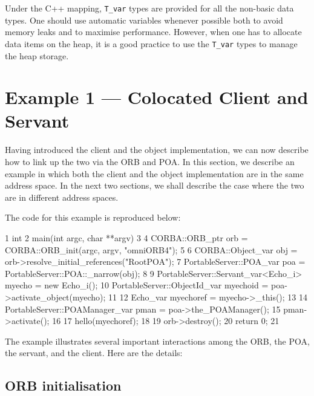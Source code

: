\documentclass[11pt,twoside,a4paper]{book}
\newcommand{\type}[1]{\texttt{#1}}
\begin{document}
Under the C++ mapping, \type{T\_var} types are provided for all the
non-basic data types.  One should use automatic variables whenever
possible both to avoid memory leaks and to maximise performance.
However, when one has to allocate data items on the heap, it is a good
practice to use the \type{T\_var} types to manage the heap storage.

\section{Example 1 --- Colocated Client and Servant}
\label{objeg1}

Having introduced the client and the object implementation, we can now
describe how to link up the two via the ORB and POA. In this section,
we describe an example in which both the client and the object
implementation are in the same address space. In the next two
sections, we shall describe the case where the two are in different
address spaces.

The code for this example is reproduced below:

\lstset{numbers=left,gobble=4}
\begin{cxxlisting}
 1  int
 2  main(int argc, char **argv)
 3  {
 4    CORBA::ORB_ptr orb = CORBA::ORB_init(argc, argv, "omniORB4");
 5
 6    CORBA::Object_var       obj = orb->resolve_initial_references("RootPOA");
 7    PortableServer::POA_var poa = PortableServer::POA::_narrow(obj);
 8
 9    PortableServer::Servant_var<Echo_i> myecho = new Echo_i();
10    PortableServer::ObjectId_var myechoid = poa->activate_object(myecho);
11
12    Echo_var myechoref = myecho->_this();
13
14    PortableServer::POAManager_var pman = poa->the_POAManager();
15    pman->activate();
16
17    hello(myechoref);
18
19    orb->destroy();
20    return 0;
21  }
\end{cxxlisting}
\lstset{numbers=none,gobble=0}

The example illustrates several important interactions among the ORB,
the POA, the servant, and the client. Here are the details:

\subsection{ORB initialisation}
\end{document}
